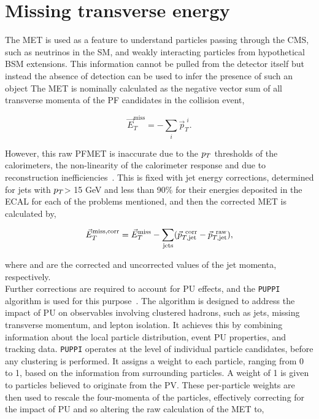 \section{Missing transverse energy}

The \ac{MET} is used as a feature to understand particles passing through the \ac{CMS}, such as neutrinos in the \ac{SM}, and weakly interacting particles from hypothetical \ac{BSM} extensions.
This information cannot be pulled from the detector itself but instead the absence of detection can be used to infer the presence of such an object
The \ac{MET} is nominally calculated as the negative vector sum of all transverse momenta of the \ac{PF} candidates in the collision event,

\begin{equation}
\vec{E}_{T}^{\text{miss}} = - \sum_{i} \vec{p}_{T}^{\hspace{4pt}i}.
\end{equation}

However, this raw \ac{PF}\ac{MET} is inaccurate due to the $p_{T}$ thresholds of the calorimeters, the non-linearity of the calorimeter response and due to reconstruction inefficiencies~\cite{CMS:2016ljj}.
This is fixed with jet energy corrections, determined for jets with $p_{T}$> 15 GeV and less than 90\% for their energies deposited in the \ac{ECAL} for each of the problems mentioned, and then the corrected \ac{MET} is calculated by,

\begin{equation}
\vec{E}_{T}^{\text{miss,corr}} = \vec{E}_{T}^{\text{miss}} - \sum_{\text{jets}} (\vec{p}_{T,\text{jet}}^{\text{\hspace{4pt}corr}} - \vec{p}_{T,\text{jet}}^{\text{\hspace{4pt}raw}}),
\end{equation}

where  and  are the corrected and uncorrected values of the jet momenta, respectively. \\

Further corrections are required to account for \ac{PU} effects, and the \texttt{PUPPI} algorithm is used for this purpose~\cite{CMS:2020ebo}.
The algorithm is designed to address the impact of \ac{PU} on observables involving clustered hadrons, such as jets, missing transverse momentum, and lepton isolation. 
It achieves this by combining information about the local particle distribution, event \ac{PU} properties, and tracking data. 
\texttt{PUPPI} operates at the level of individual particle candidates, before any clustering is performed. 
It assigns a weight to each particle, ranging from 0 to 1, based on the information from surrounding particles. 
A weight of 1 is given to particles believed to originate from the \ac{PV}. 
These per-particle weights are then used to rescale the four-momenta of the particles, effectively correcting for the impact of \ac{PU} and so altering the raw calculation of the \ac{MET} to,

